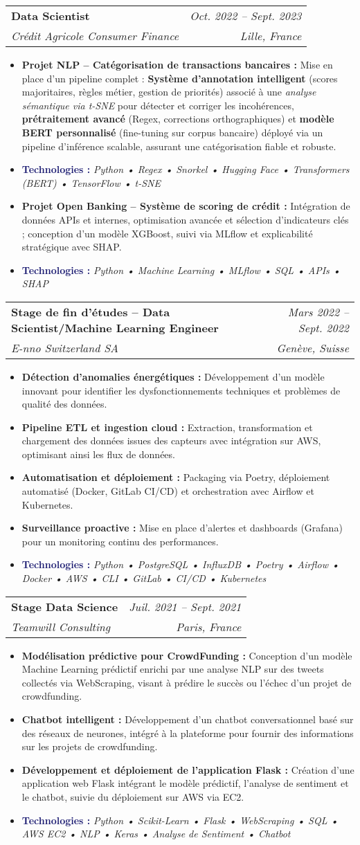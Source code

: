 \documentclass[10pt]{article}
\newcommand{\resumeSubheading}[4]{
  \vspace{-4pt}\item
    \begin{tabularx}{\textwidth}[t]{X r}
      \textbf{#1} & \textit{\small#2} \\
      \textit{\small#3} & \textit{\small#4} \\
    \end{tabularx}\vspace{-2pt}
}
\newcommand{\resumeItem}[2]{\item\small{\textbf{#1 :} #2}}
\newcommand{\resumeKeywords}[1]{\item\small{\textbf{\textcolor{MidnightBlue}{Technologies :}} \textit{#1}}}
\newcommand{\resumeItemListStart}{\begin{itemize}[leftmargin=*]\setlength\itemsep{0pt}}
\newcommand{\resumeItemListEnd}{\end{itemize}}
\begin{document}
    \resumeSubheading
      {Data Scientist}{Oct. 2022 -- Sept. 2023}
      {Crédit Agricole Consumer Finance}{Lille, France}
      \resumeItemListStart
        \resumeItem{Projet NLP -- Catégorisation de transactions bancaires}
          {Mise en place d’un pipeline complet : \textbf{Système d’annotation intelligent} (scores majoritaires, règles métier, gestion de priorités) associé à une \textit{analyse sémantique via t-SNE} pour détecter et corriger les incohérences, \textbf{prétraitement avancé} (Regex, corrections orthographiques) et \textbf{modèle BERT personnalisé} (fine-tuning sur corpus bancaire) déployé via un pipeline d’inférence scalable, assurant une catégorisation fiable et robuste.}
        \resumeKeywords{Python • Regex • Snorkel • Hugging Face • Transformers (BERT) • TensorFlow • t-SNE}
        \resumeItem{Projet Open Banking -- Système de scoring de crédit}
          {Intégration de données APIs et internes, optimisation avancée et sélection d’indicateurs clés ; conception d’un modèle XGBoost, suivi via MLflow et explicabilité stratégique avec SHAP.}
        \resumeKeywords{Python • Machine Learning • MLflow • SQL • APIs • SHAP}
      \resumeItemListEnd

    \resumeSubheading
      {Stage de fin d'études – Data Scientist/Machine Learning Engineer}{Mars 2022 -- Sept. 2022}
      {E-nno Switzerland SA}{Genève, Suisse}
      \resumeItemListStart
        \resumeItem{Détection d'anomalies énergétiques}
          {Développement d'un modèle innovant pour identifier les dysfonctionnements techniques et problèmes de qualité des données.}
        \resumeItem{Pipeline ETL et ingestion cloud}
          {Extraction, transformation et chargement des données issues des capteurs avec intégration sur AWS, optimisant ainsi les flux de données.}
        \resumeItem{Automatisation et déploiement}
          {Packaging via Poetry, déploiement automatisé (Docker, GitLab CI/CD) et orchestration avec Airflow et Kubernetes.}
        \resumeItem{Surveillance proactive}
          {Mise en place d'alertes et dashboards (Grafana) pour un monitoring continu des performances.}
        \resumeKeywords{Python • PostgreSQL • InfluxDB • Poetry • Airflow • Docker • AWS • CLI • GitLab • CI/CD • Kubernetes}
      \resumeItemListEnd

    \resumeSubheading
      {Stage Data Science}{Juil. 2021 -- Sept. 2021}
      {Teamwill Consulting}{Paris, France}
      \resumeItemListStart
        \resumeItem{Modélisation prédictive pour CrowdFunding}
          {Conception d'un modèle Machine Learning prédictif enrichi par une analyse NLP sur des tweets collectés via WebScraping, visant à prédire le succès ou l'échec d'un projet de crowdfunding.}
        \resumeItem{Chatbot intelligent}
          {Développement d'un chatbot conversationnel basé sur des réseaux de neurones, intégré à la plateforme pour fournir des informations sur les projets de crowdfunding.}
        \resumeItem{Développement et déploiement de l'application Flask}
          {Création d'une application web Flask intégrant le modèle prédictif, l'analyse de sentiment et le chatbot, suivie du déploiement sur AWS via EC2.}
        \resumeKeywords{Python • Scikit-Learn • Flask • WebScraping • SQL • AWS EC2 • NLP • Keras • Analyse de Sentiment • Chatbot}
      \resumeItemListEnd
\end{document}
